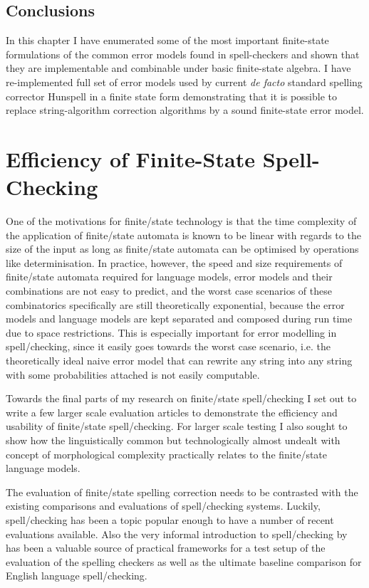 \documentclass[officiallayout]{unihelcompling}
\begin{document}
\section{Conclusions}

In this chapter I have enumerated some of the most important finite-state
formulations of the common error models found in spell-checkers and shown that
they are implementable and combinable under basic finite-state algebra. I have
re-implemented full set of error models used by current \emph{de facto}
standard spelling corrector Hunspell in a finite state form demonstrating that
it is possible to replace string-algorithm correction algorithms by a sound
finite-state error model.

\chapter{Efficiency of Finite-State Spell-Checking}
\label{chap:efficiency}

One of the motivations for finite\-/state technology is that the time
complexity of the application of finite\-/state automata is known to be linear
with regards to the size of the input as long as finite\-/state automata can be
optimised by operations like determinisation. In practice, however, the speed
and size requirements of finite\-/state automata required for language models,
error models and their combinations are not easy to predict, and the worst case
scenarios of these combinatorics specifically are still theoretically
exponential, because the error models and language models are kept separated
and composed during run time due to space restrictions. This is especially
important for error modelling in spell\-/checking, since it easily goes towards
the worst case scenario, i.e. the theoretically ideal naive error model that
can rewrite any string into any string with some probabilities attached is not
easily computable.

Towards the final parts of my research on finite\-/state spell\-/checking I set
out to write a few larger scale evaluation articles to demonstrate the
efficiency and usability of finite\-/state spell\-/checking. For larger scale
testing I also sought to show how the linguistically common but technologically
almost undealt with concept of \gls{morphological complexity} practically
relates to the finite\-/state language models.

The evaluation of finite\-/state spelling correction needs to be contrasted
with the existing comparisons and evaluations of spell\-/checking systems.
Luckily, spell\-/checking has been a topic popular enough to have a number
of recent evaluations available.  Also the very informal introduction to
spell\-/checking by~\citet{norvig2010howto} has been a valuable source of
practical frameworks for a test setup of the evaluation of the spelling
checkers as well as the ultimate baseline comparison for English language
spell\-/checking.
\end{document}
